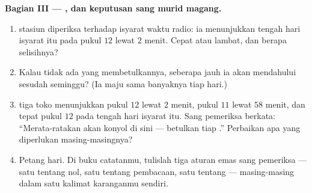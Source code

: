 \begin{problem}
\medskip\noindent\textbf{Bagian III --- , dan keputusan sang murid
magang.}
\begin{enumerate}[resume]
  \item {} stasiun diperiksa terhadap isyarat waktu radio: ia
        menunjukkan tengah hari isyarat itu pada pukul $12$ lewat $2$
        menit. Cepat atau lambat, dan berapa selisihnya?
  \item Kalau tidak ada yang membetulkannya, seberapa jauh ia akan
        mendahului sesudah seminggu? (Ia maju sama banyaknya tiap
        hari.)
  \item {} tiga toko menunjukkan pukul $12$ lewat $2$ menit, pukul
        $11$ lewat $58$ menit, dan tepat pukul $12$ pada tengah hari
        isyarat itu. Sang pemeriksa berkata: ``Merata-ratakan akan
        konyol di sini --- betulkan tiap .'' Perbaikan apa yang
        diperlukan masing-masingnya?
  \item Petang hari. Di buku catatanmu, tulislah tiga aturan emas
        sang pemeriksa --- satu tentang nol, satu tentang pembacaan,
        satu tentang  --- masing-masing dalam satu kalimat
        karanganmu sendiri.
\end{enumerate}
\end{problem}
